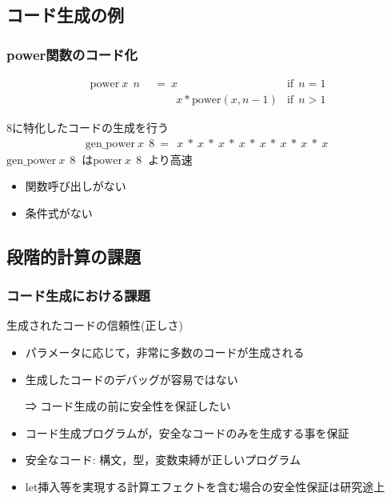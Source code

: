 \documentclass[dvipdfmx,cjk,xcolor=dvipsnames,envcountsect,notheorems,12pt]{beamer}
\theoremstyle{definition}
\begin{document}
\subsection{コード生成の例}
\begin{frame}
  \frametitle{power関数のコード化}
  \begin{align*}
    \text{power} ~x~ ~n~ &~=~ x &\text{if} ~~n = 1 \\
                         &~~~\phantom{=}~ x * \text{power}(x, n-1) &\text{if} ~~n > 1
  \end{align*}

  \pause
  8に特化したコードの生成を行う
  \begin{align*}
    \text{gen\_power} ~x~ ~8~ =~ ~x~ * ~x~ * ~x~ * ~x~ * ~x~ * ~x~ * ~x~ * ~x~
  \end{align*}
  \pause
  $\text{gen\_power} ~x~ ~8~$ は$\text{power} ~x~ ~8~$ より高速
  \begin{itemize}
  \item 関数呼び出しがない
  \item 条件式がない
  \end{itemize}
\end{frame}

\subsection{段階的計算の課題}

\begin{frame}
  \frametitle{コード生成における課題}
  生成されたコードの信頼性(正しさ)
  \begin{itemize}
  \item パラメータに応じて，非常に多数のコードが生成される
  \item 生成したコードのデバッグが容易ではない
  \item [⇒]コード生成の前に安全性を保証したい
  \end{itemize}

  \begin{itemize}
  \item<2-> コード生成プログラムが，安全なコードのみを生成する事を保証
  \item<3-> 安全なコード: 構文，型，変数束縛が正しいプログラム
  \item<4-> \alert{let挿入}等を実現する\alert{計算エフェクトを含む場合の安全性保証は研究途上}
  \end{itemize}
\end{frame}
\end{document}
